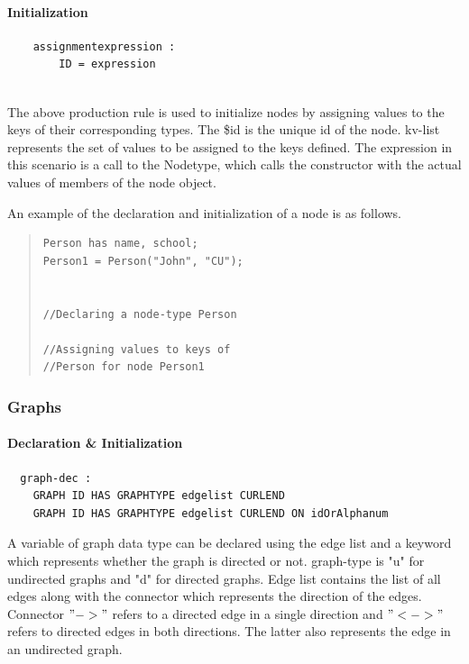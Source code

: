 \documentclass[a4paper]{article}
\begin{document}
\paragraph{Initialization}
\begin{verbatim}
    assignmentexpression :  
  		ID = expression
    
\end{verbatim}

The above production rule is used to initialize nodes by assigning values to the keys of their corresponding types. The \$id is the unique id of the node. kv-list represents the set of values to be assigned to the keys defined. The expression in this scenario is a call to the Nodetype, which calls the constructor with the actual values of members of the node object. \newline

An example of the declaration and initialization of a node is as follows.

\begin{multicols}{2}
\begin{quote}
\begin{verbatim}
Person has name, school;
Person1 = Person("John", "CU");


//Declaring a node-type Person

//Assigning values to keys of 
//Person for node Person1
\end{verbatim}
\end{quote}
\end{multicols}

\subsubsection{Graphs}
\paragraph{Declaration \& Initialization}
\begin{verbatim}
  graph-dec :  
  	GRAPH ID HAS GRAPHTYPE edgelist CURLEND
  	GRAPH ID HAS GRAPHTYPE edgelist CURLEND ON idOrAlphanum
\end{verbatim}

\indent A variable of graph data type can be declared using the edge list and a keyword which represents whether the graph is directed or not. 
graph-type is "u" for undirected graphs and "d" for directed graphs. 
Edge list contains the list of all edges along with the connector which represents the direction of the edges. Connector $"->"$ refers to a directed edge in a single direction and $"<->"$ refers to directed edges in both directions. The latter also represents the edge in an undirected graph.
 
\end{document}
